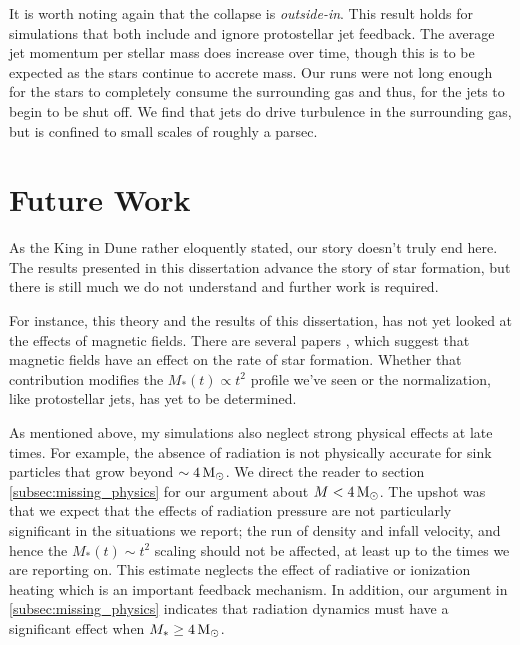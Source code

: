\documentclass[../dissertation.tex]{subfiles}
\begin{document}
It is worth noting again that the collapse is {\em outside-in}. 
This result holds for simulations that both include and ignore protostellar jet feedback. %
The average jet momentum per stellar mass does increase over time, though this is to be expected as the stars continue to accrete mass. 
Our runs were not long enough for the stars to completely consume the surrounding gas and thus, for the jets to begin to be shut off.
We find that jets do drive turbulence in the surrounding gas, but is confined to small scales of roughly a parsec.

\section{Future Work}
As the King in Dune rather eloquently stated, our story doesn't truly end here. %
The results presented in this dissertation advance the story of star formation, but there is still much we do not understand and further work is required. 

For instance, this theory and the results of this dissertation, has not yet looked at the effects of magnetic fields. 
There are several papers \citep{2009ApJ...704..891L,2015ApJ...808...48B,2017ApJ...838...40M} , which suggest that magnetic fields have an effect on the rate of star formation. 
Whether that contribution modifies the $M_*(t) \propto t^2$ profile we've seen or the normalization, like protostellar jets, has yet to be determined. 

As mentioned above, my simulations also neglect strong physical effects at late times. 
For example, the absence of radiation is not physically accurate for sink particles that grow beyond $\sim 4 {\,\rm M}_\odot$.
We direct the reader to section \ref{subsec:missing_physics} for our argument about $M < 4 {\,\rm M}_\odot$. 
The upshot was that we expect that the effects of radiation pressure are not particularly significant in the situations we report; 
the run of density and infall velocity, and hence the $M_*(t)\sim t^2$ scaling should not be affected, at least up to the times we are reporting on. 
This estimate neglects the effect of radiative or ionization heating which is an important feedback mechanism. 
In addition, our argument in \ref{subsec:missing_physics} indicates that radiation dynamics must have a significant effect when $M_* \ge 4 {\,\rm M}_\odot$. 

\end{document}
